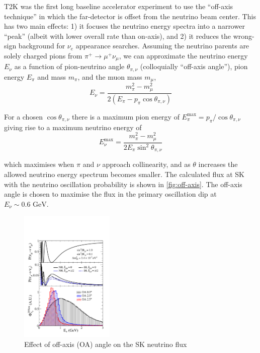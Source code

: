 T2K was the first long baseline accelerator experiment to use the ``off-axis technique'' in which the far-detector is offset from the neutrino beam center\cite{off_axis}. This has two main effects: 1) it focuses the neutrino energy spectra into a narrower ``peak'' (albeit with lower overall rate than on-axis), and 2) it reduces the wrong-sign background for $\nu_e$ appearance searches. Assuming the neutrino parents are solely charged pions from $\pi^+\rightarrow\mu^+\nu_\mu$, we can approximate the neutrino energy $E_\nu$ as a function of pion-neutrino angle $\theta_{\pi,\nu}$ (colloquially ``off-axis angle''), pion energy $E_\pi$ and mass $m_\pi$, and the muon mass $m_\mu$,
\begin{equation}
	E_\nu = \frac{m^2_\pi-m^2_\mu}{2\left( E_\pi - p_\pi \cos \theta_{\pi,\nu} \right)} 
\end{equation}

For a chosen $\cos \theta_{\pi,\nu}$ there is a maximum pion energy of $E_\pi^\text{max} = p_\pi/\cos\theta_{\pi,\nu}$ giving rise to a maximum neutrino energy of
\begin{equation}
	E_\nu^\text{max} = \frac{m^2_\pi-m^2_\mu}{2E_\pi \sin^2 \theta_{\pi,\nu}} 
\end{equation}

\noindent which maximises when $\pi$ and $\nu$ approach collinearity, and as $\theta$ increases the allowed neutrino energy spectrum becomes smaller. The calculated flux at SK with the neutrino oscillation probability is shown in \autoref{fig:off-axis}. The off-axis angle is chosen to maximise the flux in the primary oscillation dip at $E_\nu \sim 0.6\text{ GeV}$.
\begin{figure}[h]
	\includegraphics[width=0.4\textwidth, trim={0mm 0mm 0mm 0mm}, clip,page=1]{figures/det_chap/oaeffect_pnue_pnumu_flux}
	\caption{Effect of off-axis (OA) angle on the SK neutrino flux}
	\label{fig:off-axis}
\end{figure}

